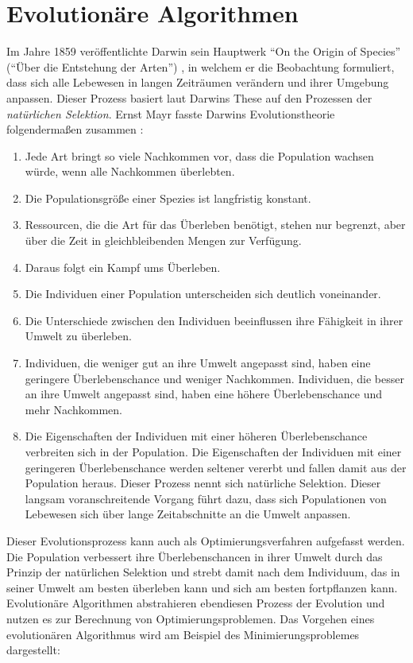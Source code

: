 \chapter{Evolutionäre Algorithmen}
Im Jahre 1859 veröffentlichte Darwin sein Hauptwerk "`On the Origin of Species"' ("`Über die Entstehung der Arten"') \cite{Darwin:1}, in welchem er die Beobachtung formuliert, dass sich alle Lebewesen in langen Zeiträumen verändern und ihrer Umgebung anpassen. Dieser Prozess basiert laut Darwins These auf den Prozessen der \textit{natürlichen Selektion}. Ernst Mayr fasste Darwins Evolutionstheorie folgendermaßen zusammen \cite{Mayr:1}: 

\begin{enumerate}
	\item Jede Art bringt so viele Nachkommen vor, dass die Population wachsen würde, wenn alle Nachkommen überlebten.
	\item Die Populationsgröße einer Spezies ist langfristig konstant. 
	\item Ressourcen, die die Art für das Überleben benötigt, stehen nur begrenzt, aber über die Zeit in gleichbleibenden Mengen zur Verfügung. 
	\item Daraus folgt ein Kampf ums Überleben. 
	\item Die Individuen einer Population unterscheiden sich deutlich voneinander. 
	\item Die Unterschiede zwischen den Individuen beeinflussen ihre Fähigkeit in ihrer Umwelt zu überleben. 
	\item Individuen, die weniger gut an ihre Umwelt angepasst sind, haben eine geringere Überlebenschance und weniger Nachkommen. Individuen, die besser an ihre Umwelt angepasst sind, haben eine höhere Überlebenschance und mehr Nachkommen.
	\item Die Eigenschaften der Individuen mit einer höheren Überlebenschance verbreiten sich in der Population. Die Eigenschaften der Individuen mit einer geringeren Überlebenschance werden seltener vererbt und fallen damit aus der Population heraus. Dieser Prozess nennt sich natürliche Selektion. Dieser langsam voranschreitende Vorgang führt dazu, dass sich Populationen von Lebewesen sich über lange Zeitabschnitte an die Umwelt anpassen. 
\end{enumerate}

Dieser Evolutionsprozess kann auch als Optimierungsverfahren aufgefasst werden. Die Population verbessert ihre Überlebenschancen in ihrer Umwelt durch das Prinzip der natürlichen Selektion und strebt damit nach dem Individuum, das in seiner Umwelt am besten überleben kann und sich am besten fortpflanzen kann. Evolutionäre Algorithmen abstrahieren ebendiesen Prozess der Evolution und nutzen es zur Berechnung von Optimierungsproblemen. Das Vorgehen eines evolutionären Algorithmus wird am Beispiel des Minimierungsproblemes dargestellt:


